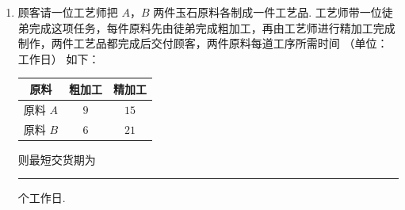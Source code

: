 \begin{description}
\begin{enumerate}[leftmargin=5pt]
        \item 顾客请一位工艺师把 \(A\)，\(B\) 两件玉石原料各制成一件工艺品. 工艺师带一位徒弟完成这项任务，每件原料先由徒弟完成粗加工，再由工艺师进行精加工完成制作，两件工艺品都完成后交付顾客，两件原料每道工序所需时间 （单位：工作日） 如下：

\begin{center}
\begin{tabular}{c|c|c}
\hline
原料 & 粗加工 & 精加工 \\
\hline
原料 \(A\) & \(9\) & \(15\) \\
\hline
原料 \(B\) & \(6\) & \(21\) \\
\hline
\end{tabular}
\end{center}

则最短交货期为\rule[-0.3ex]{3em}{0.4pt}\(\text{个工作日}\).

    \end{enumerate}

\end{description}

